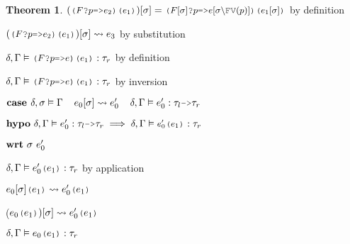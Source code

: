 \documentclass[acmsmall]{acmart}
\theoremstyle{definition}
\newtheorem{theorem}{Theorem}[section]
\begin{document}
\begin{theorem}
        \item \Z\Z\Z $(\J{($F$?$p$=>$e_2$)($e_1$)})[\sigma] = \J{($F[\sigma]$?$p$=>$e[\sigma\backslash\text{FV}(p)]$)($e_1[\sigma]$)}
        $ by definition
        \item \Z\Z\Z $(\J{($F$?$p$=>$e_2$)($e_1$)})[\sigma] \rightsquigarrow e_3$ by substitution 

        \item \Z\Z\Z $\delta, \Gamma \satisfies \J{($F$?$p$=>$e$)($e_1$)} \hastype \tau_r$ by definition
      \item \Z\Z $\delta, \Gamma \satisfies \J{($F$?$p$=>$e$)($e_1$)} \hastype \tau_r$ by inversion 


    \item \Z $\B{case }
      \delta, \sigma \satisfies \Gamma
      \I
      e_0[\sigma] \rightsquigarrow e_0'
      \I
      \delta, \Gamma \satisfies e_0' \hastype \tau_l \J{->} \tau_r
    $
    \item \Z $\B{hypo}\ 
      \delta, \Gamma \satisfies e_0' \hastype \tau_l \J{->} \tau_r
      \implies
      \delta, \Gamma \satisfies \J{$e_0'$($e_1$)} \hastype \tau_r
    $
    \item \Z $ 
    \textbf{wrt}\ \sigma\ e_0' 
    $
      \item \Z\Z $\delta, \Gamma \satisfies e_0'\J{(}e_1\J{)} \hastype \tau_r$ by application 
      \item \Z\Z $e_0[\sigma]\J{(}e_1\J{)} \rightsquigarrow e_0'\J{(}e_1\J{)}$
      \item \Z\Z ($e_0\J{(}e_1\J{)})[\sigma] \rightsquigarrow e_0'\J{(}e_1\J{)}$
      \item \Z\Z $\delta, \Gamma \satisfies e_0\J{(}e_1\J{)} \hastype \tau_r$ 


\end{theorem}
\end{document}
